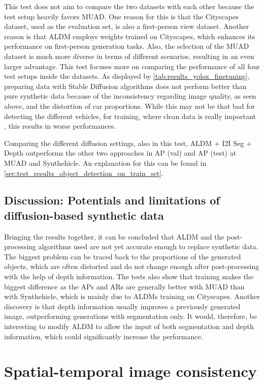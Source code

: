 This test does not aim to compare the two datasets with each other because the test setup heavily favors MUAD. One reason for this is that the Cityscapes dataset, used as the evaluation set, is also a first-person view dataset. Another reason is that ALDM employs weights trained on Cityscapes, which enhances its performance on first-person generation tasks. Also, the selection of the MUAD dataset is much more diverse in terms of different scenarios, resulting in an even larger advantage. This test focuses more on comparing the performance of all four test setups inside the datasets. As displayed by \autoref{tab:results_yolox_finetuning}, preparing data with Stable Diffusion algorithms does not perform better than pure synthetic data because of the inconsistency regarding image quality, as seen above, and the distortion of car proportions. While this may not be that bad for detecting the different vehicles, for training, where clean data is really important \cite{Lazer2014GoogleFlu}, this results in worse performances.

Comparing the different diffusion settings, also in this test, ALDM + I2I Seg + Depth outperforms the other two approaches in AP (val) and AP (test) at MUAD and Synthehicle. An explanation for this can be found in \autoref{sec:test_results_object_detection_on_train_set}.


\subsection{Discussion: Potentials and limitations of diffusion-based synthetic data}
Bringing the results together, it can be concluded that ALDM and the post-processing algorithms used are not yet accurate enough to replace synthetic data. The biggest problem can be traced back to the proportions of the generated objects, which are often distorted and do not change enough after post-processing with the help of depth information. The tests also show that training makes the biggest difference as the APs and ARs are generally better with MUAD than with Synthehicle, which is mainly due to ALDMs training on Cityscapes. Another discovery is that depth information usually improves a previously generated image, outperforming generations with segmentation only. It would, therefore, be interesting to modify ALDM to allow the input of both segmentation and depth information, which could significantly increase the performance.

\section{Spatial-temporal image consistency}

